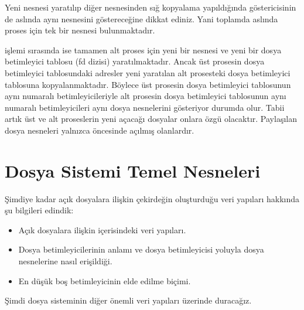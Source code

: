 \documentclass[a4paper,10pt,turkish]{sphinxmanual}
\begin{document}
\sphinxAtStartPar
Yeni  nesnesi yaratılıp diğer  nesnesinden sığ kopyalama
yapıldığında  göstericisinin de aslında aynı  nesnesini göstereceğine
dikkat ediniz. Yani toplamda aslında proses için tek bir  nesnesi bulunmaktadır.

\sphinxAtStartPar
{} işlemi sırasında ise tamamen alt proses için yeni bir  nesnesi ve yeni
bir dosya betimleyici tablosu (fd dizisi) yaratılmaktadır. Ancak üst prosesin dosya betimleyici
tablosundaki adresler yeni yaratılan alt prosesteki dosya betimleyici tablosuna kopyalanmaktadır.
Böylece üst prosesin dosya betimleyici tablosunun aynı numaralı betimleyicileriyle alt prosesin
dosya betimleyici tablosunun aynı numaralı betimleyicileri aynı dosya nesnelerini gösteriyor
durumda olur. Tabii artık üst ve alt proseslerin yeni açacağı dosyalar onlara özgü olacaktır.
Paylaşılan dosya nesneleri yalnızca  öncesinde açılmış olanlardır.


\section{Dosya Sistemi Temel Nesneleri}
\label{\detokenize{filesystem1:dosya-sistemi-temel-nesneleri}}
\sphinxAtStartPar
Şimdiye kadar açık dosyalara ilişkin çekirdeğin oluşturduğu veri yapıları hakkında şu bilgileri
edindik:
\begin{itemize}
\item {} 
\sphinxAtStartPar
Açık dosyalara ilişkin  içerisindeki veri yapıları.

\item {} 
\sphinxAtStartPar
Dosya betimleyicilerinin anlamı ve dosya betimleyicisi yoluyla dosya nesnelerine nasıl
erişildiği.

\item {} 
\sphinxAtStartPar
En düşük boş betimleyicinin elde edilme biçimi.

\end{itemize}

\sphinxAtStartPar
Şimdi dosya sisteminin diğer önemli veri yapıları üzerinde duracağız.
\end{document}
